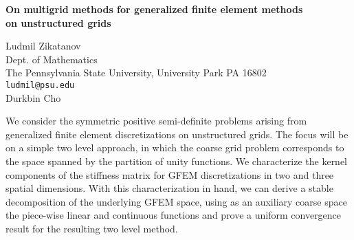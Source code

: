 \documentclass{report}
\begin{document}

\begin{center}
{\large
{\bf On multigrid methods for generalized finite element methods \\
	on unstructured grids}}

	Ludmil Zikatanov \\
	Dept. of Mathematics \\
	The Pennsylvania State University, University Park PA 16802 \\
	{\tt ludmil@psu.edu} \\
	Durkbin Cho
\end{center}
We consider the symmetric positive semi-definite problems
arising from generalized finite element discretizations on
unstructured grids. The focus will be on a simple two level
approach, in which the coarse grid problem corresponds to
the space spanned by the partition of unity functions. We
characterize the kernel components of the stiffness matrix
for GFEM discretizations in two and three spatial
dimensions. With this characterization in hand, we can
derive a stable decomposition of the underlying GFEM space,
using as an auxiliary coarse space the piece-wise linear and
continuous functions and prove a uniform convergence result
for the resulting two level method.



\end{document}
